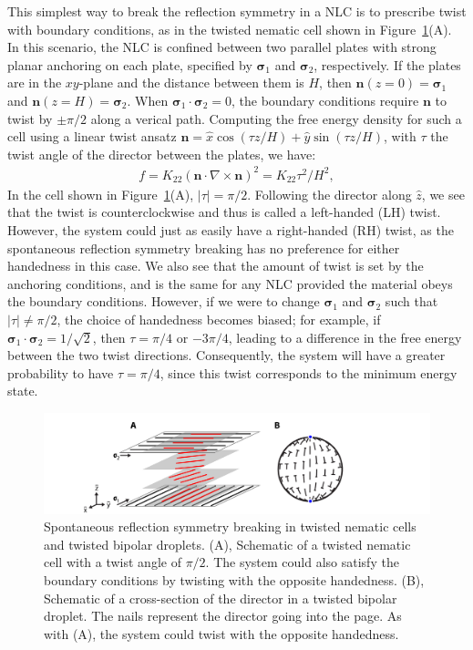 This simplest way to break the reflection symmetry in a NLC is to prescribe twist with boundary conditions, as in the twisted nematic cell shown in Figure~\ref{f:4-SSB}(A).
In this scenario, the NLC is confined between two parallel plates with strong planar anchoring on each plate, specified by $\bm{\sigma}_1$ and $\bm{\sigma}_2$, respectively.
If the plates are in the $xy$-plane and the distance between them is $H$, then $\mathbf{n}(z = 0) = \bm{\sigma}_1$ and $\mathbf{n}(z = H) = \bm{\sigma}_2$.
When $\bm{\sigma}_1 \cdot \bm{\sigma}_2 = 0$, the boundary conditions require $\mathbf{n}$ to twist by $\pm \pi/2$ along a verical path.
Computing the free energy density for such a cell using a linear twist ansatz $\mathbf{n} = \hat{x} \cos (\tau z/H) + \hat{y} \sin(\tau z/H)$, with $\tau$ the twist angle of the director between the plates, we have:
\begin{align}
  f = K_{22}(\mathbf{n} \cdot \nabla \times \mathbf{n})^2 = K_{22}\tau^2/H^2,
\end{align}
In the cell shown in Figure~\ref{f:4-SSB}(A), $|\tau| = \pi/2$.
Following the director along $\hat{z}$, we see that the twist is counterclockwise and thus is called a left-handed (LH) twist.
However, the system could just as easily have a right-handed (RH) twist, as the spontaneous reflection symmetry breaking has no preference for either handedness in this case.
We also see that the amount of twist is set by the anchoring conditions, and is the same for any NLC provided the material obeys the boundary conditions.
However, if we were to change $\bm{\sigma}_1$ and $\bm{\sigma}_2$ such that $|\tau| \neq \pi/2$, the choice of handedness becomes biased; for example, if $\bm{\sigma}_1 \cdot \bm{\sigma}_2 = 1/\sqrt{2}$, then $\tau = \pi/4$ or $-3\pi/4$, leading to a difference in the free energy between the two twist directions.
Consequently, the system will have a greater probability to have $\tau = \pi/4$, since this twist corresponds to the minimum energy state.
\begin{figure}
  \centering
  \includegraphics{figures/C4/Ch4-Figs_SSB.png}
  \caption{Spontaneous reflection symmetry breaking in twisted nematic cells and twisted bipolar droplets.
  (A), Schematic of a twisted nematic cell with a twist angle of $\pi/2$.
  The system could also satisfy the boundary conditions by twisting with the opposite handedness.
  (B), Schematic of a cross-section of the director in a twisted bipolar droplet.
  The nails represent the director going into the page.
  As with (A), the system could twist with the opposite handedness.}\label{f:4-SSB}
\end{figure}

